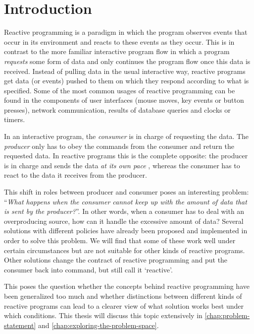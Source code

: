 \chapter*{Introduction}

Reactive programming is a paradigm in which the program observes events that occur in its environment and reacts to these events as they occur. This is in contrast to the more familiar interactive program flow in which a program \emph{requests} some form of data and only continues the program flow once this data is received. Instead of pulling data in the usual interactive way, reactive programs get data (or events) pushed to them on which they respond according to what is specified. Some of the most common usages of reactive programming can be found in the components of user interfaces (mouse moves, key events or button presses), network communication, results of database queries and clocks or timers. \cite{meijer2012-YMIAD}

In an interactive program, the \textit{consumer} is in charge of requesting the data. The \textit{producer} only has to obey the commands from the consumer and return the requested data. In reactive programs this is the complete opposite: the producer is in charge and sends the data \emph{at its own pace} \cite{berry1991-Reactive}, whereas the consumer has to react to the data it receives from the producer.

This shift in roles between producer and consumer poses an interesting problem: ``\textit{What happens when the consumer cannot keep up with the amount of data that is sent by the producer?}''. In other words, when a consumer has to deal with an overproducing source, how can it handle the excessive amount of data? Several solutions with different policies have already been proposed and implemented in order to solve this problem. We will find that some of these work well under certain circumstances but are not suitable for other kinds of reactive programs. Other solutions change the contract of reactive programming and put the consumer back into command, but still call it `reactive'.

This poses the question whether the concepts behind reactive programming have been generalized too much and whether distinctions between different kinds of reactive programs can lead to a clearer view of what solution works best under which conditions. This thesis will discuss this topic extensively in \autoref{chap:problem-statement} and \autoref{chap:exploring-the-problem-space}.

